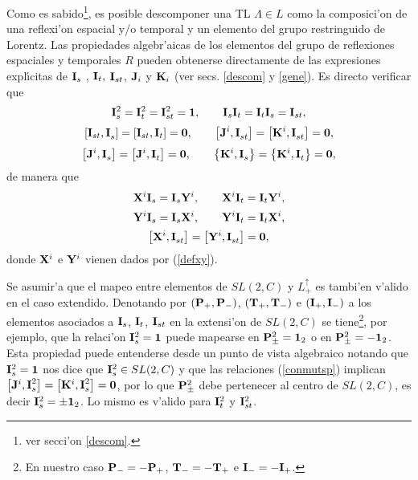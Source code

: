 Como es sabido\footnote{%
ver secci'on \ref{descom}.}, es posible descomponer una TL $\Lambda \in L$
como la composici'on de una reflexi'on espacial y/o temporal y un
elemento del grupo restringuido de Lorentz. Las propiedades algebr'aicas
de los elementos del grupo de reflexiones espaciales y temporales $R$ pueden
obtenerse directamente de las expresiones expl{\'{\i }}citas de ${\bf I}_{s}$%
, ${\bf I}_{t},$ ${\bf I}_{st}$, ${\bf J}_{i}$ y ${\bf K}_{i}$ (ver secs. 
\ref{descom} y \ref{gene}). Es directo verificar que 
\begin{equation}
{\bf I}_{s}^2={\bf I}_{t}^2={\bf I}_{st}^2={\bf 1},\qquad {\bf I}_{s}%
{\bf I}_{t}={\bf I}_{t}{\bf I}_{s}={\bf I}_{st}, 
\end{equation}
\begin{equation}
\left[ {\bf I}_{st}{\bf ,I}_{s}\right] =\left[ {\bf I}_{st},{\bf I}_{t}%
\right] ={\bf 0,\qquad }\left[ {\bf J}^{i}{\bf ,I}_{st}\right] =\left[ {\bf K%
}^{i}{\bf ,I}_{st}\right] ={\bf 0,} 
\end{equation}
\begin{equation}
\left[ {\bf J}^{i}{\bf ,I}_{s}\right] =\left[ {\bf J}^{i}{\bf ,I}_{t}\right]
={\bf 0,\qquad }\left\{ {\bf K}^{i}{\bf ,I}_{s}\right\} =\left\{ {\bf K}^{i}%
{\bf ,I}_{t}\right\} ={\bf 0,}  \label{conmutsp}
\end{equation}
de manera que 
\begin{equation}
{\bf X}^{i}{\bf I}_{s}={\bf I}_{s}{\bf Y}^{i},\qquad {\bf X}^{i}{\bf I}_{t}=%
{\bf I}_{t}{\bf Y}^{i},  \label{pasa1}
\end{equation}
\begin{equation}
{\bf Y}^{i}{\bf I}_{s}={\bf I}_{s}{\bf X}^{i},\qquad {\bf Y}^{i}{\bf I}_{t}=%
{\bf I}_{t}{\bf X}^{i},  \label{pasa2}
\end{equation}
\begin{equation}
\left[ {\bf X}^{i}{\bf ,I}_{st}\right] =\left[ {\bf Y}^{i}{\bf ,I}_{st}%
\right] ={\bf 0,}
\end{equation}
donde ${\bf X}^{i}$ e ${\bf Y}^{i}$ vienen dados por (\ref{defxy}).

Se asumir'a que el mapeo entre elementos de $SL(2,C)$ y $L_{+}^{\uparrow
} $ es tambi'en v'alido en el caso extendido. Denotando por $\left( 
{\bf P}_{+},{\bf P}_{-}\right) $, $\left( {\bf T}_{+},{\bf T}_{-}\right) $ e 
$\left( {\bf I}_{+},{\bf I}_{-}\right) $ a los elementos asociados a ${\bf I}%
_{s}$, ${\bf I}_{t}$, ${\bf I}_{st}$ en la extensi'on de $SL(2,C)$ se
tiene\footnote{%
En nuestro caso ${\bf P}_{-}=-{\bf P}_{+}$, ${\bf T}_{-}=-{\bf T}_{+}$ e $%
{\bf I}_{-}=-{\bf I}_{+}$.}, por ejemplo, que la relaci'on ${\bf I}%
_{s}^2={\bf 1}$ puede mapearse en ${\bf P}_{\pm }^2={\bf 1}_{2}$ o en $%
{\bf P}_{\pm }^2=-{\bf 1}_{2}$. Esta propiedad puede entenderse desde un
punto de vista algebraico notando que ${\bf I}_{s}^2={\bf 1}$ nos dice que 
${\bf I}_{s}^2\in SL(2,C)$ y que las relaciones (\ref{conmutsp}) implican $%
\left[ {\bf J}^{i}{\bf ,I}_{s}^2\right] =\left[ {\bf K}^{i}{\bf ,I}_{s}^2%
\right] ={\bf 0}$, por lo que ${\bf P}_{\pm }^2$ debe pertenecer al centro
de $SL(2,C)$, es decir ${\bf I}_{s}^2=\pm {\bf 1}_{2}$. Lo mismo es v'alido
para ${\bf I}_{t}^2$ y ${\bf I}_{st}^2$.


